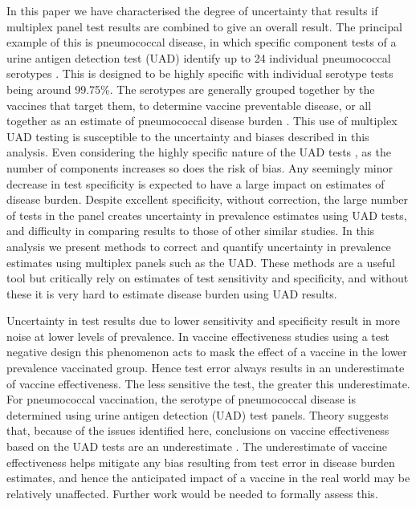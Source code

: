 \documentclass[10pt,letterpaper]{article}
\begin{document}
In this paper we have characterised the degree of uncertainty that results if multiplex panel test results are combined to give an overall result. The principal example of this is pneumococcal disease, in which specific component tests of a urine antigen detection test (UAD) identify up to 24 individual pneumococcal serotypes \cite{pride2012,bonten2015}. This is designed to be highly specific with individual serotype tests being around 99.75\%. The serotypes are generally grouped together by the vaccines that target them, to determine vaccine preventable disease, or all together as an estimate of pneumococcal disease burden \cite{hyams2023}. This use of multiplex UAD testing is susceptible to the uncertainty and biases described in this analysis. Even considering the highly specific nature of the UAD tests \cite{pride2012}, as the number of components increases so does the risk of bias. Any seemingly minor decrease in test specificity is expected to have a large impact on estimates of disease burden. Despite excellent specificity, without correction, the large number of tests in the panel creates uncertainty in prevalence estimates using UAD tests, and difficulty in comparing results to those of other similar studies. In this analysis we present methods to correct and quantify uncertainty in prevalence estimates using multiplex panels such as the UAD. These methods are a useful tool but critically rely on estimates of test sensitivity and specificity, and without these it is very hard to estimate disease burden using UAD results.

Uncertainty in test results due to lower sensitivity and specificity result in more noise at lower levels of prevalence\cite{haile2024,endo2020}. In vaccine effectiveness studies using a test negative design this phenomenon acts to mask the effect of a vaccine in the lower prevalence vaccinated group. Hence test error always results in an underestimate of vaccine effectiveness\cite{endo2020}. The less sensitive the test, the greater this underestimate. For pneumococcal vaccination, the serotype of pneumococcal disease is determined using urine antigen detection (UAD) test panels\cite{pride2012,bonten2015}. Theory suggests that, because of the issues identified here, conclusions on vaccine effectiveness based on the UAD tests are an underestimate \cite{endo2020}. The underestimate of vaccine effectiveness helps mitigate any bias resulting from test error in disease burden estimates, and hence the anticipated impact of a vaccine in the real world may be relatively unaffected. Further work would be needed to formally assess this.
\end{document}

